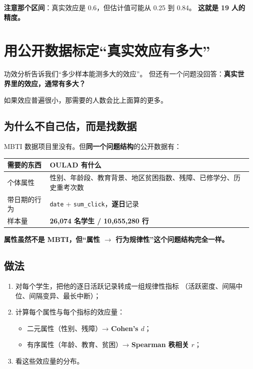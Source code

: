 \documentclass[UTF8,a4paper,11pt]{ctexart}
\begin{document}
\textbf{注意那个区间}：真实效应是 0.6，但估计值可能从 0.25 到 0.84。
\textbf{这就是 19 人的精度。}

\newpage


\section{用公开数据标定“真实效应有多大”}

功效分析告诉我们“多少样本能测多大的效应”。
但还有一个问题没回答：\textbf{真实世界里的效应，通常有多大？}

如果效应普遍很小，那需要的人数会比上面算的更多。

\subsection{为什么不自己估，而是找数据}

MBTI 数据项目里没有。但\textbf{同一个问题结构}的公开数据有：

\begin{center}
\begin{tabular}{p{3.4cm}p{10.4cm}}
\toprule
\textbf{需要的东西} & \textbf{OULAD 有什么} \\
\midrule
个体属性 & 性别、年龄段、教育背景、地区贫困指数、残障、已修学分、历史重考次数 \\
带日期的行为 & \texttt{date} + \texttt{sum\_click}，\textbf{逐日}记录 \\
样本量 & \textbf{26,074 名学生 / 10,655,280 行} \\
\bottomrule
\end{tabular}
\end{center}

\textbf{属性虽然不是 MBTI，但“属性 $\to$ 行为规律性”这个问题结构完全一样。}

\subsection{做法}

\begin{enumerate}[leftmargin=1.8em]
\item 对每个学生，把他的逐日活跃记录转成一组规律性指标
      （活跃密度、间隔中位、间隔变异、最长中断）；
\item 计算每个属性与每个指标的效应量：
  \begin{itemize}
  \item 二元属性（性别、残障）→ \textbf{Cohen's $d$}；
  \item 有序属性（年龄、教育、贫困）→ \textbf{Spearman 秩相关 $r$}；
  \end{itemize}
\item 看这些效应量的分布。
\end{enumerate}
\end{document}
